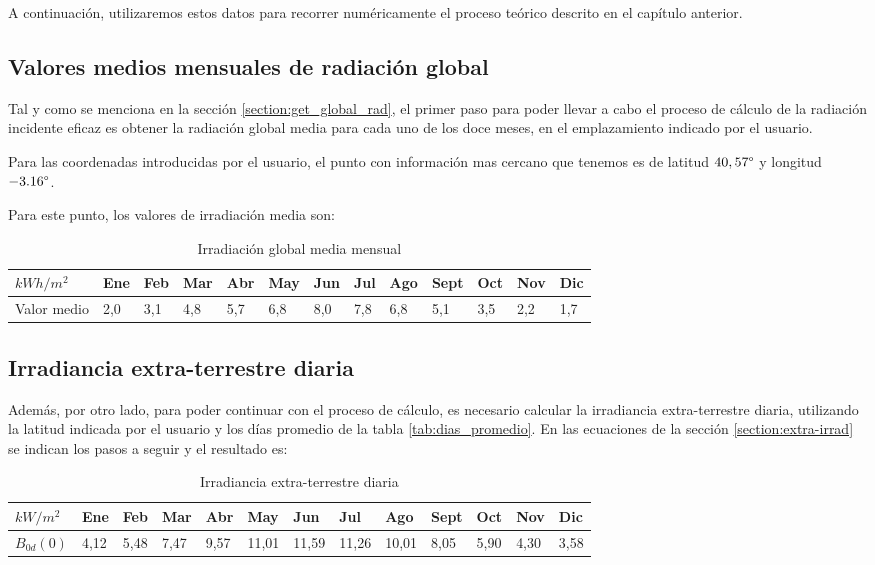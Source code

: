 A continuación, utilizaremos estos datos para recorrer numéricamente el proceso teórico descrito en el capítulo anterior. 

\subsection{Valores medios mensuales de radiación global}

Tal y como se menciona en la sección \ref{section:get_global_rad}, el primer paso para poder llevar a cabo el proceso de cálculo de la radiación incidente eficaz es obtener la radiación global media para cada uno de los doce meses, en el emplazamiento indicado por el usuario.

Para las coordenadas introducidas por el usuario, el punto con información mas cercano que tenemos es de latitud  $40,57 \degree$ y longitud $-3.16 \degree$. 

Para este punto, los valores de irradiación media son:
\begin{table}[ht]
\centering
\begin{tabular}{|l|l|l|l|l|l|l|l|l|l|l|l|l|}
\hline
$kWh/m^2$   & Ene & Feb & Mar & Abr & May & Jun & Jul & Ago & Sept & Oct & Nov & Dic \\ \hline
Valor medio & 2,0 & 3,1 & 4,8 & 5,7 & 6,8 & 8,0 & 7,8 & 6,8 & 5,1  & 3,5 & 2,2 & 1,7 \\ \hline
\end{tabular}
\label{tab:mean_values_monthly}
\caption{Irradiación global media mensual}
\end{table}

\subsection{Irradiancia extra-terrestre diaria}

Además, por otro lado, para poder continuar con el proceso de cálculo, es necesario calcular la irradiancia extra-terrestre diaria, utilizando la latitud indicada por el usuario y los días promedio de la tabla \ref{tab:dias_promedio}.
En las ecuaciones de la sección \ref{section:extra-irrad} se indican los pasos a seguir y el resultado es:
\begin{table}[ht]
\centering
\begin{tabular}{|l|l|l|l|l|l|l|l|l|l|l|l|l|}
\hline
$kW/m^2$   & Ene & Feb & Mar & Abr & May & Jun & Jul & Ago & Sept & Oct & Nov & Dic \\ \hline
$B_{0d}(0)$ & 4,12 & 5,48 & 7,47 & 9,57 & 11,01 & 11,59 & 11,26 & 10,01 & 8,05 & 5,90  & 4,30 & 3,58 \\ \hline
\end{tabular}
\label{tab:extra_irrad_values}
\caption{Irradiancia extra-terrestre diaria}
\end{table}

